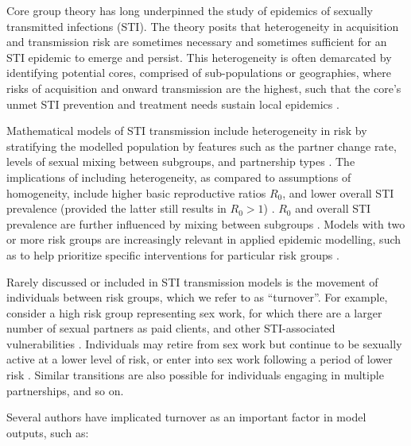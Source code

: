 Core group theory has long underpinned the study of
epidemics of sexually transmitted infections (STI).
The theory posits that heterogeneity in
acquisition and transmission risk are sometimes necessary and sometimes sufficient for
an STI epidemic to emerge and persist.
This heterogeneity is often demarcated by identifying potential cores,
comprised of sub-populations or geographies,
where risks of acquisition and onward transmission are the highest,
such that the core's unmet STI prevention and treatment needs
sustain local epidemics
\citep{Yorke1978,Gesink2011}.
\par
Mathematical models of STI transmission include heterogeneity in risk
by stratifying the modelled population by features such as
the partner change rate,
levels of sexual mixing between subgroups, and
partnership types
\citep{Mishra2012}.
The implications of including heterogeneity,
as compared to assumptions of homogeneity, include
higher basic reproductive ratios $R_0$, and
lower overall STI prevalence
(provided the latter still results in $R_0 > 1$)
\citep{Boily1997}.
$R_0$ and overall STI prevalence are further influenced by
mixing between subgroups \citep{Stigum1994,Boily1997}.
Models with two or more risk groups
are increasingly relevant in applied epidemic modelling,
such as to help prioritize specific interventions for particular risk groups
\citep{Mishra2012}.
\par
Rarely discussed or included in STI transmission models
is the movement of individuals between risk groups,
which we refer to as ``turnover''.
For example, consider a high risk group representing sex work,
for which there are a larger number of sexual partners as paid clients,
and other STI-associated vulnerabilities
\citep{Watts2010}.
Individuals may
retire from sex work but continue to be sexually active at a lower level of risk,
or enter into sex work following a period of lower risk
\citep{Boily2015}.
Similar transitions are also possible for
individuals engaging in multiple partnerships, and so on.
\par
Several authors have implicated turnover as 
an important factor in model outputs, such as:
